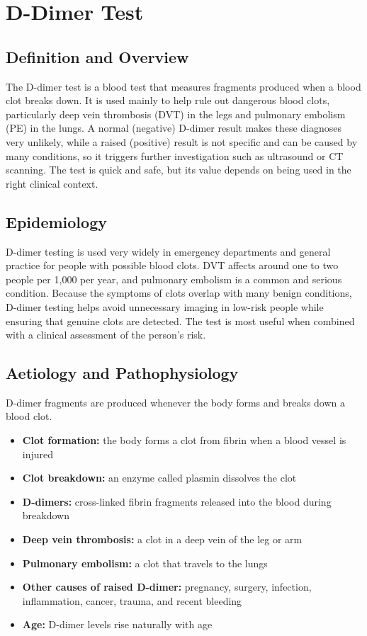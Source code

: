 \chapter{D-Dimer Test}

\section*{Definition and Overview}
The D-dimer test is a blood test that measures fragments produced when a blood clot breaks down. It is used mainly to help rule out dangerous blood clots, particularly deep vein thrombosis (DVT) in the legs and pulmonary embolism (PE) in the lungs. A normal (negative) D-dimer result makes these diagnoses very unlikely, while a raised (positive) result is not specific and can be caused by many conditions, so it triggers further investigation such as ultrasound or CT scanning. The test is quick and safe, but its value depends on being used in the right clinical context.

\section*{Epidemiology}
D-dimer testing is used very widely in emergency departments and general practice for people with possible blood clots. DVT affects around one to two people per 1,000 per year, and pulmonary embolism is a common and serious condition. Because the symptoms of clots overlap with many benign conditions, D-dimer testing helps avoid unnecessary imaging in low-risk people while ensuring that genuine clots are detected. The test is most useful when combined with a clinical assessment of the person's risk.

\section*{Aetiology and Pathophysiology}
D-dimer fragments are produced whenever the body forms and breaks down a blood clot.

\begin{itemize}
    \item \textbf{Clot formation:} the body forms a clot from fibrin when a blood vessel is injured
    \item \textbf{Clot breakdown:} an enzyme called plasmin dissolves the clot
    \item \textbf{D-dimers:} cross-linked fibrin fragments released into the blood during breakdown
    \item \textbf{Deep vein thrombosis:} a clot in a deep vein of the leg or arm
    \item \textbf{Pulmonary embolism:} a clot that travels to the lungs
    \item \textbf{Other causes of raised D-dimer:} pregnancy, surgery, infection, inflammation, cancer, trauma, and recent bleeding
    \item \textbf{Age:} D-dimer levels rise naturally with age
\end{itemize}

